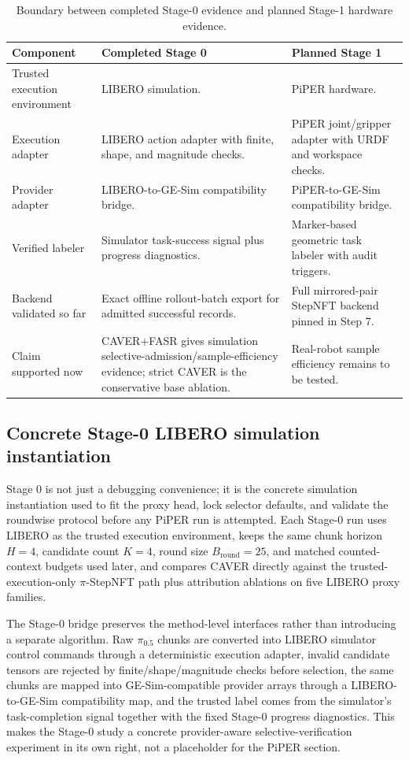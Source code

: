 \documentclass[10pt]{article}
\theoremstyle{plain}
\theoremstyle{definition}
\theoremstyle{remark}
\begin{document}
\begin{table}[H]
\centering
\small
\caption{Boundary between completed Stage-0 evidence and planned Stage-1 hardware evidence.\label{tab:stage0_stage1_boundary}}
\begin{tabularx}{\linewidth}{@{}p{3.2cm}XX@{}}
\toprule
Component & Completed Stage 0 & Planned Stage 1 \\
\midrule
Trusted execution environment & LIBERO simulation. & PiPER hardware. \\
Execution adapter & LIBERO action adapter with finite, shape, and magnitude checks. & PiPER joint/gripper adapter with URDF and workspace checks. \\
Provider adapter & LIBERO-to-GE-Sim compatibility bridge. & PiPER-to-GE-Sim compatibility bridge. \\
Verified labeler & Simulator task-success signal plus progress diagnostics. & Marker-based geometric task labeler with audit triggers. \\
Backend validated so far & Exact offline rollout-batch export for admitted successful records. & Full mirrored-pair StepNFT backend pinned in Step 7. \\
Claim supported now & CAVER+FASR gives simulation selective-admission/sample-efficiency evidence; strict CAVER is the conservative base ablation. & Real-robot sample efficiency remains to be tested. \\
\bottomrule
\end{tabularx}
\end{table}

\subsection{Concrete Stage-0 LIBERO simulation instantiation}
Stage 0 is not just a debugging convenience; it is the concrete simulation instantiation used to fit the proxy head, lock selector defaults, and validate the roundwise protocol before any PiPER run is attempted. Each Stage-0 run uses LIBERO as the trusted execution environment, keeps the same chunk horizon $H=4$, candidate count $K=4$, round size $B_{\mathrm{round}}=25$, and matched counted-context budgets used later, and compares CAVER directly against the trusted-execution-only $\pi$-StepNFT path plus attribution ablations on five LIBERO proxy families.

The Stage-0 bridge preserves the method-level interfaces rather than introducing a separate algorithm. Raw $\pi_{0.5}$ chunks are converted into LIBERO simulator control commands through a deterministic execution adapter, invalid candidate tensors are rejected by finite/shape/magnitude checks before selection, the same chunks are mapped into GE-Sim-compatible provider arrays through a LIBERO-to-GE-Sim compatibility map, and the trusted label comes from the simulator's task-completion signal together with the fixed Stage-0 progress diagnostics. This makes the Stage-0 study a concrete provider-aware selective-verification experiment in its own right, not a placeholder for the PiPER section.
\end{document}
